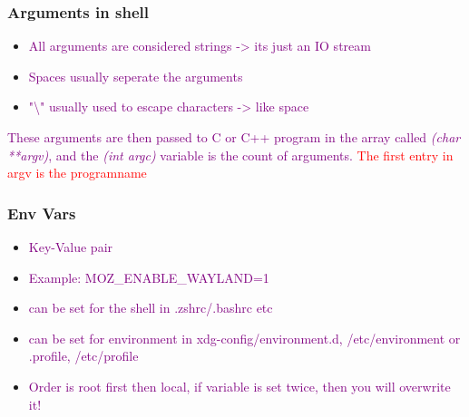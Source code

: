 \documentclass[main.tex,fontsize=8pt,paper=a4,paper=portrait,DIV=calc,]{scrartcl}
\begin{document}
\subsubsection{Arguments in shell}
\begin{itemize}
\item \textcolor{purple}{All arguments are considered strings -> its just an IO stream}
\item \textcolor{purple}{Spaces usually seperate the arguments}
\item \textcolor{purple}{"\textbackslash" usually used to escape characters -> like space}
\end{itemize} 
\textcolor{purple}{These arguments are then passed to C or C++ program in the array called \emph{(char **argv)}, and the \emph{(int argc)} variable is the count of arguments.}\newline
\textcolor{red}{The first entry in argv is the programname}

\subsubsection{Env Vars}
\begin{itemize}
\item \textcolor{purple}{Key-Value pair}
\item \textcolor{purple}{Example: MOZ\_ENABLE\_WAYLAND=1}
\item \textcolor{purple}{can be set for the shell in .zshrc/.bashrc etc}
\item \textcolor{purple}{can be set for environment in xdg-config/environment.d, /etc/environment or .profile, /etc/profile}
\item \textcolor{purple}{Order is root first then local, if variable is set twice, then you will overwrite it!}
\end{itemize}
\end{document}
